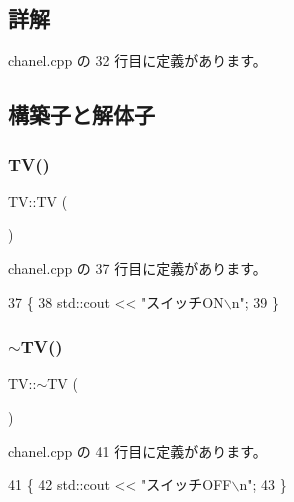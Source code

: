 \subsection{詳解}


 chanel.\+cpp の 32 行目に定義があります。



\subsection{構築子と解体子}
\mbox{\label{class_t_v_a02a3fb40f0a254fef0b4aacb6362b563}} 
\subsubsection{\texorpdfstring{T\+V()}{TV()}}
{\footnotesize\ttfamily T\+V\+::\+TV (\begin{DoxyParamCaption}{ }\end{DoxyParamCaption})\hspace{0.3cm}{\ttfamily [inline]}}



 chanel.\+cpp の 37 行目に定義があります。


\begin{DoxyCode}
37         \{
38         std::cout << \textcolor{stringliteral}{"スイッチON\(\backslash\)n"};
39     \}
\end{DoxyCode}
\mbox{\label{class_t_v_a377383017c486aa83467f7ad977e3653}} 
\subsubsection{\texorpdfstring{$\sim$\+T\+V()}{~TV()}}
{\footnotesize\ttfamily T\+V\+::$\sim$\+TV (\begin{DoxyParamCaption}{ }\end{DoxyParamCaption})\hspace{0.3cm}{\ttfamily [inline]}}



 chanel.\+cpp の 41 行目に定義があります。


\begin{DoxyCode}
41          \{
42         std::cout << \textcolor{stringliteral}{"スイッチOFF\(\backslash\)n"};
43     \}
\end{DoxyCode}


